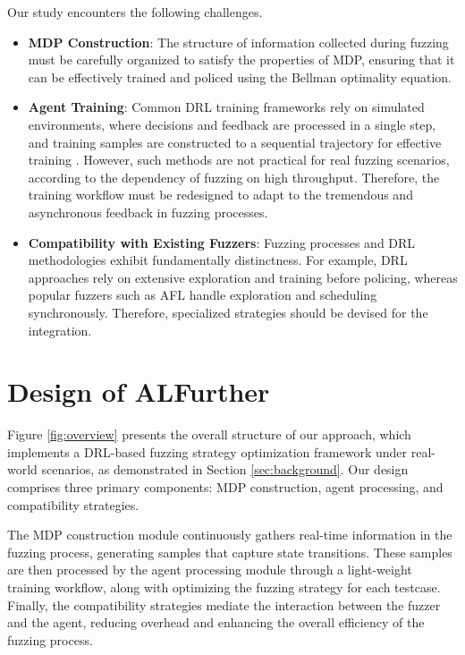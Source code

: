 \documentclass[lettersize,journal]{IEEEtran}
\begin{document}
Our study encounters the following challenges.
\begin{itemize}
	\item \textbf{MDP Construction}: The structure of information collected during fuzzing must be carefully organized to satisfy the properties of MDP, ensuring that it can be effectively trained and policed using the Bellman optimality equation.
	\item \textbf{Agent Training}: Common DRL training frameworks rely on simulated environments, where decisions and feedback are processed in a single step, and training samples are constructed to a sequential trajectory for effective training \cite{schulmanProximalPolicyOptimization2017}. However, such methods are not practical for real fuzzing scenarios, according to the dependency of fuzzing on high throughput. Therefore, the training workflow must be redesigned to adapt to the tremendous and asynchronous feedback in fuzzing processes.
	\item \textbf{Compatibility with Existing Fuzzers}: Fuzzing processes and DRL methodologies exhibit fundamentally distinctness. For example, DRL approaches rely on extensive exploration and training before policing, whereas popular fuzzers such as AFL handle exploration and scheduling synchronously. Therefore, specialized strategies should be devised for the integration.
\end{itemize}


\section{Design of ALFurther}\label{sec:method}

Figure \ref{fig:overview} presents the overall structure of our approach, which implements a DRL-based fuzzing strategy optimization framework under real-world scenarios, as demonstrated in Section \ref{sec:background}. Our design comprises three primary components: MDP construction, agent processing, and compatibility strategies.

The MDP construction module continuously gathers real-time information in the fuzzing process, generating samples that capture state transitions. These samples are then processed by the agent processing module through a light-weight training workflow, along with optimizing the fuzzing strategy for each testcase. Finally, the compatibility strategies mediate the interaction between the fuzzer and the agent, reducing overhead and enhancing the overall efficiency of the fuzzing process.
\end{document}
